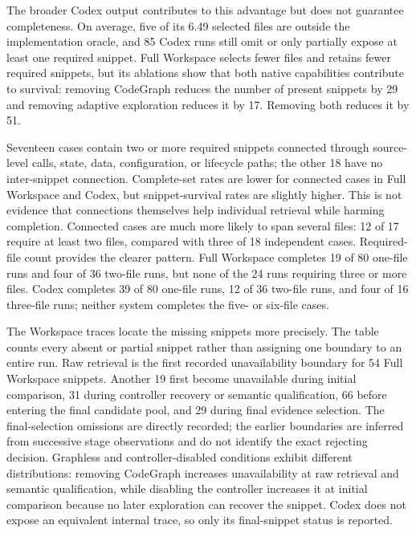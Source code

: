 The broader Codex output contributes to this advantage but does not guarantee completeness. On average, five of its 6.49 selected files are outside the implementation oracle, and 85 Codex runs still omit or only partially expose at least one required snippet. Full Workspace selects fewer files and retains fewer required snippets, but its ablations show that both native capabilities contribute to survival: removing CodeGraph reduces the number of present snippets by 29 and removing adaptive exploration reduces it by 17. Removing both reduces it by 51.

Seventeen cases contain two or more required snippets connected through source-level calls, state, data, configuration, or lifecycle paths; the other 18 have no inter-snippet connection. Complete-set rates are lower for connected cases in Full Workspace and Codex, but snippet-survival rates are slightly higher. This is not evidence that connections themselves help individual retrieval while harming completion. Connected cases are much more likely to span several files: 12 of 17 require at least two files, compared with three of 18 independent cases. Required-file count provides the clearer pattern. Full Workspace completes 19 of 80 one-file runs and four of 36 two-file runs, but none of the 24 runs requiring three or more files. Codex completes 39 of 80 one-file runs, 12 of 36 two-file runs, and four of 16 three-file runs; neither system completes the five- or six-file cases.

The Workspace traces locate the missing snippets more precisely. The table counts every absent or partial snippet rather than assigning one boundary to an entire run. Raw retrieval is the first recorded unavailability boundary for 54 Full Workspace snippets. Another 19 first become unavailable during initial comparison, 31 during controller recovery or semantic qualification, 66 before entering the final candidate pool, and 29 during final evidence selection. The final-selection omissions are directly recorded; the earlier boundaries are inferred from successive stage observations and do not identify the exact rejecting decision. Graphless and controller-disabled conditions exhibit different distributions: removing CodeGraph increases unavailability at raw retrieval and semantic qualification, while disabling the controller increases it at initial comparison because no later exploration can recover the snippet. Codex does not expose an equivalent internal trace, so only its final-snippet status is reported.

